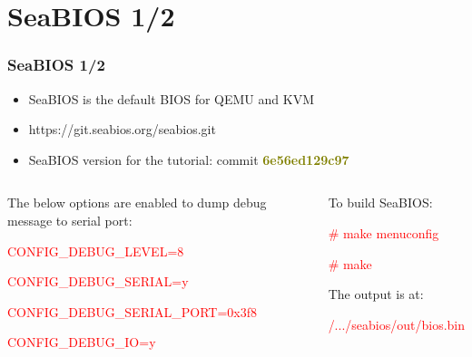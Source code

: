 \documentclass[aspectratio=169]{beamer}
\begin{document}
\section{SeaBIOS 1/2}
\begin{frame}
\frametitle{SeaBIOS 1/2}
\begin{itemize}
\item {\Large SeaBIOS is the default BIOS for QEMU and KVM}
\item {\Large https://git.seabios.org/seabios.git}
\item {\Large SeaBIOS version for the tutorial: commit \textbf{\textcolor{olive}{6e56ed129c97}}}
\end{itemize}
\begin{columns}[c]
\begin{block}{}
{
The below options are enabled to dump debug message to serial port: \newline

\textcolor{red}{CONFIG\_DEBUG\_LEVEL=8}

\textcolor{red}{CONFIG\_DEBUG\_SERIAL=y}

\textcolor{red}{CONFIG\_DEBUG\_SERIAL\_PORT=0x3f8}

\textcolor{red}{CONFIG\_DEBUG\_IO=y}

}
\end{block}
\begin{block}{}
{
To build SeaBIOS:

\textcolor{red}{\# make menuconfig}

\textcolor{red}{\# make} \newline

The output is at:

\textcolor{red}{/.../seabios/out/bios.bin}
}
\end{block}
\end{columns}
\end{frame}

\end{document}
